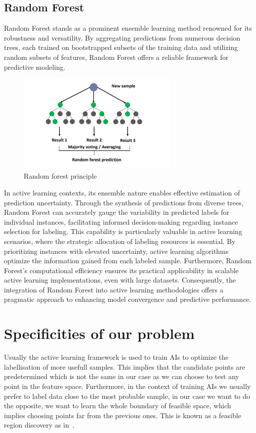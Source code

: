 \documentclass[11pt]{article}
\begin{document}
\subsection{Random Forest}
Random Forest stands as a prominent ensemble learning method renowned for its robustness and versatility. By aggregating predictions from numerous decision trees, each trained on bootstrapped subsets of the training data and utilizing random subsets of features, Random Forest offers a reliable framework for predictive modeling.
\begin{figure}[H]
  \centering
  \includegraphics[width=0.7\textwidth]{RF.png}
  \caption{Random forest principle}\label{fig:rf}
\end{figure}
In active learning contexts, its ensemble nature enables effective estimation of prediction uncertainty. Through the synthesis of predictions from diverse trees, Random Forest can accurately gauge the variability in predicted labels for individual instances, facilitating informed decision-making regarding instance selection for labeling\cite{gu_active_2015}. This capability is particularly valuable in active learning scenarios, where the strategic allocation of labeling resources is essential. By prioritizing instances with elevated uncertainty, active learning algorithms optimize the information gained from each labeled sample. Furthermore, Random Forest's computational efficiency ensures its practical applicability in scalable active learning implementations, even with large datasets. Consequently, the integration of Random Forest into active learning methodologies offers a pragmatic approach to enhancing model convergence and predictive performance.


\section{Specificities of our problem}
Usually the active learning framework is used to train AIs to optimize the labellisation of more usefull samples. This implies that the candidate points are predetermined which is not the same in our case as we can choose to test any point in the feature space. Furthermore, in the context of training AIs we usually prefer to label data close to the most probable sample, in our case we want to do the opposite, we want to learn the whole boundary of feasible space, which implies choosing points far from the previous ones. This is known as a feasible region discovery as in~\cite[Knudde (2019)]{knudde_active_2019}.
\end{document}
